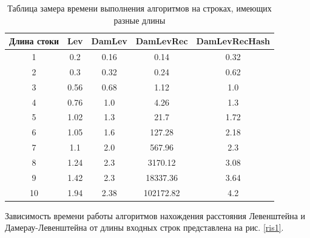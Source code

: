 \documentclass[12pt]{report}
\begin{document}
	\begin{table} [H]
		\caption{Таблица замера времени выполнения алгоритмов на строках, имеющих разные длины}
		\center
		\label{table:t1}
			\begin{tabular}{|c | c | c | c | c|}
				
				\hline
				
				Длина стоки & Lev & DamLev & DamLevRec &  DamLevRecHash \\ [0.5ex]
				
				\hline
				
				1 & 0.2 & 0.16 & 0.14 & 0.32 \\ 
				
				\hline 
				
				2 & 0.3 & 0.32 & 0.24 & 0.62 \\ 
				
				\hline 
				
				3 & 0.56 & 0.68 & 1.12 & 1.0 \\ 
				
				\hline 
				
				4 & 0.76 & 1.0 & 4.26 & 1.3 \\ 
				
				\hline 
				
				5 & 1.02 & 1.3 & 21.7 & 1.72 \\ 
				
				\hline 
				
				6 & 1.05 & 1.6 & 127.28 & 2.18 \\ 
				
				\hline 
				
				7 & 1.1 & 2.0 & 567.96 & 2.3 \\ 
				
				\hline 
				
				8 & 1.24 & 2.3 & 3170.12 & 3.08 \\ 
				
				\hline 
				
				9 & 1.42 & 2.3 & 18337.36 & 3.64\\ 
				
				\hline 
				
				10 & 1.94 & 2.38 & 102172.82 & 4.2\\ 
				
				\hline 
			\end{tabular}
	\end{table}

	Зависимость времени работы алгоритмов нахождения расстояния Левенштейна и Дамерау-Левенштейна от длины входных строк представлена на рис. \ref{ris1}.
\end{document}
